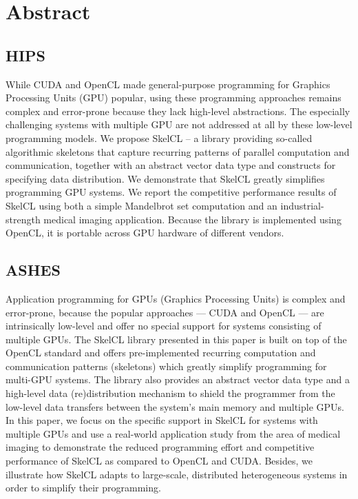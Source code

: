 \section{Abstract}

\subsection{HIPS}
While CUDA and OpenCL made general-purpose programming for Graphics Processing Units (GPU) popular,
using these programming approaches remains complex and error-prone because they lack high-level abstractions.
The especially challenging systems with multiple GPU are not addressed at all by these low-level programming models.
We propose SkelCL -- a library providing so-called algorithmic skeletons that capture recurring patterns of parallel computation and communication,
together with an abstract vector data type and constructs for specifying data distribution.
We demonstrate that SkelCL greatly simplifies programming GPU systems.
We report the competitive performance results of SkelCL using both a simple Mandelbrot set
computation and an industrial-strength medical imaging application.
Because the library is implemented using OpenCL, it is portable across GPU hardware of different vendors.


\subsection{ASHES}
Application programming for GPUs (Graphics Processing Units) is complex and error-prone, because the popular approaches --- CUDA and OpenCL --- are intrinsically low-level and offer no special support for systems consisting of multiple GPUs.
The SkelCL library presented in this paper is built on top of the OpenCL standard and offers pre-implemented recurring computation and communication patterns (skeletons) which greatly simplify programming for multi-GPU systems.
The library also provides an abstract vector data type and a high-level data (re)distribution mechanism to shield the programmer from the low-level data transfers between the system's main memory and multiple GPUs.
In this paper, we focus on the specific support in SkelCL for systems with multiple GPUs and use a real-world application study from the area of medical imaging to demonstrate the reduced programming effort and competitive performance of SkelCL as compared to OpenCL and CUDA.
Besides, we illustrate how SkelCL adapts to large-scale, distributed heterogeneous systems in order to simplify their programming.


